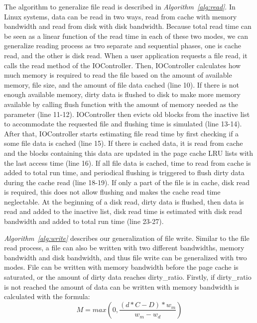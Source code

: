 \documentclass[conference]{IEEEtran}
\begin{document}
			The algorithm to generalize file read is described in 
			\textit{Algorithm~\ref{alg:read}}. In Linux systems, data can be read in 
			two ways, read from cache with memory bandwidth and read from disk 
			with disk bandwidth. Because total read time can be seen as a 
			linear function of the read time in each of these two modes, 
			we can generalize reading process as two separate and sequential phases, 
			one is cache read, and the other is disk read. When a user application 
			requests a file read, it calls the read method of the IOController. Then, 
			IOController calculates how much memory is required to read the file 
			based on the amount of available memory, file size, and the amount of 
			file data cached (line 10). If there is not enough available memory, 
			dirty data is flushed to disk to make more memory available by calling flush
			function with the amount of memory needed as the parameter (line 11-12).
			IOController then evicts old blocks from the inactive list to
			accommodate the requested file and flushing time is simulated (line 13-14). 
			After that, IOController starts estimating file read time by first checking 
			if a some file data is cached (line 15). If there is cached data, 
			it is read from cache and the blocks containing this data are updated in 
			the page cache LRU lists with the last access time (line 16). If all file data 
			is cached, time to read from cache is added to total run time, and 
			periodical flushing is triggered to flush dirty data during the cache read 
			(line 18-19). If only a part of the file is in cache, disk read is required, 
			this does not allow flushing and makes the cache read time neglectable. 
			At the beginning of a disk read, dirty data is flushed, then data is read 
			and added to the inactive list, disk read time is estimated with disk read 
			bandwidth and added to total run time (line 23-27). 

			\textit{Algorithm~\ref{alg:write}} describes our
			generalization of file write. Similar to the file read process,
			a file can also be written with two different bandwidths,
			memory bandwidth and disk bandwidth, and thus file write can be
			generalized with two modes. File can be written with memory
			bandwidth before the page cache is saturated, or the amount of
			dirty data reaches dirty\_ratio. Firstly, if dirty\_ratio is not reached 
			the amount of data can be written with memory bandwidth is
			calculated with the formula:
			\begin{equation}
				M = max(0, \frac{(d*C - D)*w_m}{w_m - w_d})\label{equa:freeamt}
			\end{equation}			 			
\end{document}
